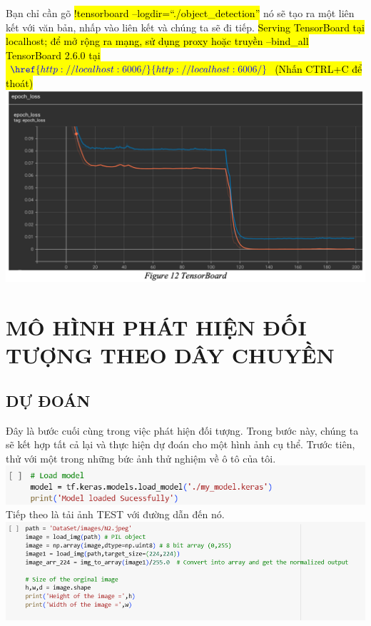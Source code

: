 \documentclass{article}
\begin{document}
Bạn chỉ cần gõ \hl{!tensorboard --logdir=\textquotedblleft./object\_detection\textquotedblright}  nó sẽ tạo ra một liên kết với văn bản, nhấp vào liên kết và chúng ta sẽ đi tiếp. \hl{Serving TensorBoard tại localhost; để mở rộng ra mạng, sử dụng proxy hoặc truyền --bind\_all TensorBoard 2.6.0 tại $\textcolor{blue}{\href{http://localhost:6006/}{http://localhost:6006/}}$ (Nhấn CTRL+C để thoát)} \\

\includegraphics[width = 15cm]{img/img1/Notebook8.png}



\section{MÔ HÌNH PHÁT HIỆN ĐỐI TƯỢNG THEO DÂY CHUYỀN}
\subsection{DỰ ĐOÁN}
Đây là bước cuối cùng trong việc phát hiện đối tượng. Trong bước này, chúng ta sẽ kết hợp tất cả lại và thực hiện dự đoán cho một hình ảnh cụ thể. Trước tiên, thử với một trong những bức ảnh thử nghiệm về ô tô của tôi.\\

\includegraphics[width= 17cm]{img/img1/7.png}\\

Tiếp theo là tải ảnh TEST với đường dẫn đến nó.\\

\includegraphics[width= 17cm]{img/img1/8.png}
\end{document}

